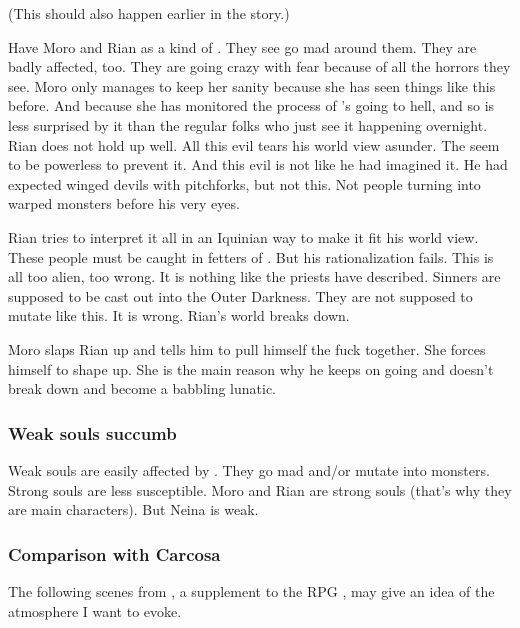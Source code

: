 (This should also happen earlier in the story.)

Have Moro and Rian as a kind of .
They see \Malcur go mad around them.
They are badly affected, too.
They are going crazy with fear because of all the horrors they see.
Moro only manages to keep her sanity because she has seen things like this before. 
And because she has monitored the process of \Malcur's going to hell, and so is less surprised by it than the regular folks who just see it happening overnight. 
Rian does not hold up well. 
All this evil tears his world view asunder. 
The \sephiroth seem to be powerless to prevent it. 
And this evil is not like he had imagined it.
He had expected winged devils with pitchforks, but not this. 
Not people turning into warped monsters before his very eyes. 

Rian tries to interpret it all in an Iquinian way to make it fit his world view. 
These people must be caught in fetters of \itzach. 
But his rationalization fails. 
This is all too alien, too wrong. 
It is nothing like the priests have described. 
Sinners are supposed to be cast out into the Outer Darkness. 
They are not supposed to mutate like this. 
It is wrong. 
Rian's world breaks down.

Moro slaps Rian up and tells him to pull himself the fuck together. 
She forces himself to shape up.
She is the main reason why he keeps on going and doesn't break down and become a babbling lunatic. 





\subsubsection{Weak souls succumb}
Weak souls are easily affected by . 
They go mad and/or mutate into monsters. 
Strong souls are less susceptible. 
Moro and Rian are strong souls (that's why they are main characters).
But Neina is weak. 





\subsubsection{Comparison with Carcosa}
The following scenes from \cite{RPG:CallofCthulhu:GreatOldOnes}, a supplement to the RPG \cite{RPG:CallofCthulhu}, may give an idea of the atmosphere I want to evoke. 

